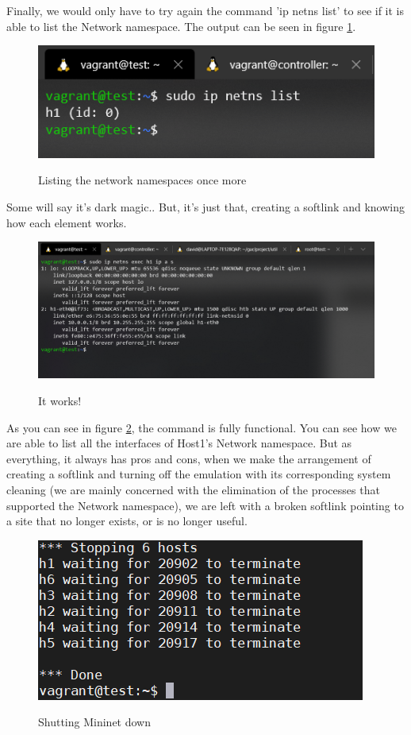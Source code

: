 \documentclass[12pt]{article}
\begin{document}
			Finally, we would only have to try again the command 'ip netns list' to see if it is able to list the Network namespace. The output can be seen in figure \ref{f:it_works}.
            \newpage
			\begin{figure}[!htb]
				\centering
				\includegraphics[width=\linewidth]{it_works.png}
				\label{f:it_works}
				\caption{Listing the network namespaces once more}
			\end{figure}
                
    
			Some will say it's dark magic.. But, it's just that, creating a softlink and knowing how each element works.

			\begin{figure}[!htb]
				\centering
				\includegraphics[width=\linewidth]{iproute2_fixed.png}
				\label{f:iproute2_fixed}
				\caption{It works!}
			\end{figure}

			As you can see in figure \ref{f:iproute2_fixed}, the command is fully functional. You can see how we are able to list all the interfaces of Host1's Network namespace. But as everything, it always has pros and cons, when we make the arrangement of creating a softlink and turning off the emulation with its corresponding system cleaning (we are mainly concerned with the elimination of the processes that supported the Network namespace), we are left with a broken softlink pointing to a site that no longer exists, or is no longer useful.
            \newpage
			\begin{figure}
				\centering
				\includegraphics[width=0.7\linewidth]{shutting_down.png}
				\label{f:shutting_down}
				\caption{Shutting Mininet down}
			\end{figure}
\end{document}
